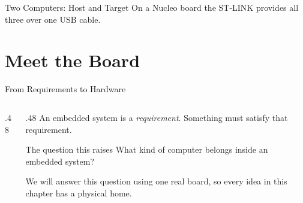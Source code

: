 \documentclass[9pt,aspectratio=169,xcolor=table]{beamer}
\begin{document}
\begin{frame}{Two Computers: Host and Target}
    \vspace{2mm}
    {\small On a Nucleo board the \alert{ST-LINK} provides all three over one USB cable.}
\end{frame}

\section{Meet the Board}
\begin{frame}{From Requirements to Hardware}
	\begin{columns}[c]
		\begin{column}{.48\textwidth}
			\begin{center}
			\end{center}
		\end{column}
		\begin{column}{.48\textwidth}
			An embedded system is a \emph{requirement}. Something must
			satisfy that requirement.
			\vspace{3mm}
			\begin{block}{The question this raises}
				\centering\alert{What kind of computer belongs inside an embedded system?}
			\end{block}
			\vspace{2mm}
			{\small We will answer this question using one real board,
			so every idea in this chapter has a physical home.}
		\end{column}
	\end{columns}
\end{frame}
\end{document}
